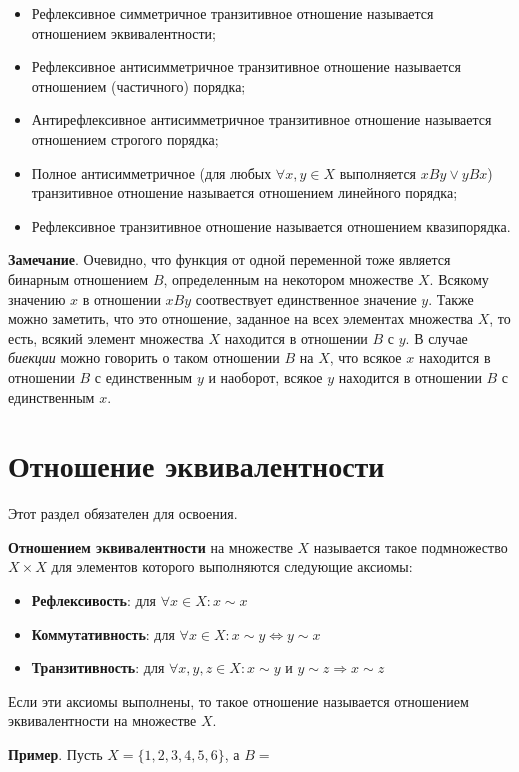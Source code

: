\documentclass[a4paper]{book}
\begin{document}
\begin{itemize}
	\item Рефлексивное симметричное транзитивное отношение называется отношением эквивалентности;
	\item Рефлексивное антисимметричное транзитивное отношение называется отношением (частичного) порядка;
	\item Антирефлексивное антисимметричное транзитивное отношение называется отношением строгого порядка;
	\item Полное антисимметричное (для любых $\forall x,y\in X$ выполняется $ xBy \vee  yBx$) транзитивное отношение называется отношением линейного порядка;
	\item Рефлексивное транзитивное отношение называется отношением квазипорядка.
\end{itemize}

\textbf{Замечание}. Очевидно, что функция от одной переменной тоже является бинарным отношением $B$, определенным на некотором множестве $X$. Всякому значению $x$ в отношении $xBy$ соотвествует единственное значение $y$. Также можно заметить, что это отношение, заданное на всех элементах множества $X$, то есть, всякий элемент множества $X$ находится в отношении $B$ с  $y$. В случае \textit{биекции} можно говорить о таком отношении $B$ на $X$, что всякое $x$ находится в отношении $B$ с единственным $y$ и наоборот, всякое $y$ находится в отношении $B$ с единственным $x$. 

\section{Отношение эквивалентности}
Этот раздел обязателен для освоения. 

\textbf{Отношением эквивалентности} на множестве $X$ называется такое подмножество $X \times X$ для элементов которого выполняются следующие аксиомы:
\begin{itemize}
	\item \textbf{Рефлексивость}: для $\forall x\in X: x\sim x$
	\item \textbf{Коммутативность}: для $\forall x\in X: x\sim y \Leftrightarrow y\sim x$
	\item \textbf{Транзитивность}: для $\forall x,y,z\in X: x\sim y$ и $y\sim z \Rightarrow x\sim z$
\end{itemize}	
Если эти аксиомы выполнены, то такое отношение называется отношением эквивалентности на множестве $X$.

\textbf{Пример}. Пусть $X = \{1,2,3,4,5,6\}$, а $B = $
\end{document}
